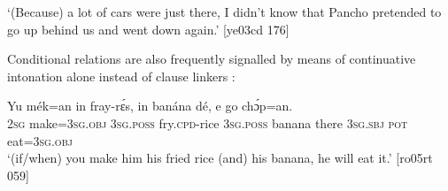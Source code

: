 \glt ‘(Because) a lot of cars were just there, I didn’t know that Pancho pretended to 
go up behind us and went down again.’ [ye03cd 176]
\z

Conditional relations are also frequently signalled by means of continuative intonation alone instead of clause linkers :


\ea%
    \label{ex:key:1539}
    \gll Yu  mék=an    in    fray-rɛ́s,    in    banána  dé, 
e    go  chɔ́p=an.\\
\textsc{2sg}  make=\textsc{3sg.obj}  \textsc{3sg.poss}  fry.\textsc{cpd}{}-rice  \textsc{3sg.poss}  banana  there
\textsc{3sg.sbj}  \textsc{pot}  eat=\textsc{3sg.obj}\\

\glt ‘(if/when) you make him his fried rice (and) his banana, he will eat it.’ [ro05rt 059]
\z

